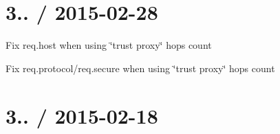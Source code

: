 {\ttfamily \section*{3.. / 2015-\/02-\/28 }}

{\ttfamily }

{\ttfamily 
\begin{DoxyItemize}
\item Fix {\ttfamily req.\+host} when using \char`\"{}trust proxy\char`\"{} hops count
\item Fix {\ttfamily req.\+protocol}/{\ttfamily req.\+secure} when using \char`\"{}trust proxy\char`\"{} hops count
\end{DoxyItemize}}

{\ttfamily \section*{3.. / 2015-\/02-\/18 }}

{\ttfamily }

